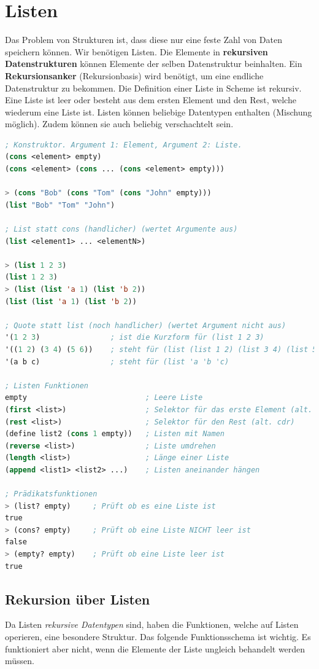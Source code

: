 \section{Listen}
Das Problem von Strukturen ist, dass diese nur eine feste Zahl von Daten speichern können. Wir benötigen Listen. Die Elemente in \textbf{rekursiven Datenstrukturen} können Elemente der selben Datenstruktur beinhalten. Ein \textbf{Rekursionsanker} (Rekursionbasis) wird benötigt, um eine endliche Datenstruktur zu bekommen.
Die Definition einer Liste in Scheme ist rekursiv. Eine Liste ist leer oder besteht aus dem ersten Element und den Rest, welche wiederum eine Liste ist. Listen können beliebige Datentypen enthalten (Mischung möglich). Zudem können sie auch beliebig verschachtelt sein.

\begin{lstlisting}[language=Lisp, caption=Listen]
; Konstruktor. Argument 1: Element, Argument 2: Liste.
(cons <element> empty)
(cons <element> (cons ... (cons <element> empty)))

> (cons "Bob" (cons "Tom" (cons "John" empty)))
(list "Bob" "Tom" "John")

; List statt cons (handlicher) (wertet Argumente aus)
(list <element1> ... <elementN>)

> (list 1 2 3)
(list 1 2 3)
> (list (list 'a 1) (list 'b 2))
(list (list 'a 1) (list 'b 2))

; Quote statt list (noch handlicher) (wertet Argument nicht aus)
'(1 2 3) 				; ist die Kurzform für (list 1 2 3)
'((1 2) (3 4) (5 6)) 	; steht für (list (list 1 2) (list 3 4) (list 5 6))
'(a b c) 				; steht für (list 'a 'b 'c)

; Listen Funktionen
empty 							; Leere Liste
(first <list>) 					; Selektor für das erste Element (alt. car)
(rest <list>) 				  	; Selektor für den Rest (alt. cdr)
(define list2 (cons 1 empty)) 	; Listen mit Namen
(reverse <list>)				; Liste umdrehen
(length <list>)					; Länge einer Liste
(append <list1> <list2> ...)	; Listen aneinander hängen

; Prädikatsfunktionen
> (list? empty) 	; Prüft ob es eine Liste ist
true
> (cons? empty) 	; Prüft ob eine Liste NICHT leer ist
false
> (empty? empty) 	; Prüft ob eine Liste leer ist
true
\end{lstlisting}

\newpage
\subsection{Rekursion über Listen}
Da Listen \emph{rekursive Datentypen} sind, haben die Funktionen, welche auf Listen operieren, eine besondere Struktur. Das folgende Funktionsschema ist wichtig. Es funktioniert aber nicht, wenn die Elemente der Liste ungleich behandelt werden müssen.


